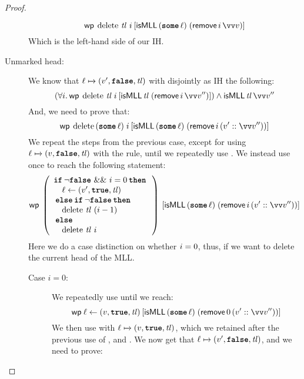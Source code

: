 \documentclass[thesis.tex]{subfiles}
\begin{document}
\begin{proof}
\begin{description}
\[                  \wpre{\MLLdelete\,\tl\ \iindex}{\isMLL\, (\Some \loc)\; (\textlog{remove}\, \iindex\, \vect{\val})}
              \]
              Which is the left-hand side of our IH.
        \item[Unmarked head:] We know that $\loc \fmapsto (\val', \False, \tl)$ with disjointly as IH the following:
              \[(\All \iindex. \wpre{\MLLdelete\, \tl\; \iindex}{\isMLL\, \tl\; (\textlog{remove}\, \iindex\, \vect{\val}'')}) \land \isMLL\, \tl\, \vect{\val}''\]
              And, we need to prove that:
              \[\wpre{\MLLdelete\, (\Some \loc)\; \iindex}{\isMLL\, (\Some \loc)\; (\textlog{remove}\, \iindex\, (\val' :: \vect{\val}''))}\]
              We repeat the steps from the previous case, except for using $\loc \fmapsto (\val, \False, \tl)$ with the  rule, until we repeatedly use . We instead use  once to reach the following statement:
              \[
                  \wpre{\left(
                      \begin{array}{l}
                              \If \lnot\False\ \&\&\ \iindex = 0 then \\
                              \quad \loc \gets (\val', \True, \tl)    \\
                              \Else \If \lnot\False then              \\
                              \quad \MLLdelete\,\tl\ (\iindex - 1)    \\
                              \Else                                   \\
                              \quad \MLLdelete\,\tl\ \iindex
                          \end{array}
                      \right)}{\isMLL\, (\Some \loc)\; (\textlog{remove}\, \iindex\, (\val' :: \vect{\val}''))}
              \]
              Here we do a case distinction on whether $i = 0$, thus, if we want to delete the current head of the MLL.
              \begin{description}
                  \item[Case $i = 0$:] We repeatedly use  until we reach:
                        \[
                            \wpre{\loc \gets (\val, \True, \tl)}{\isMLL\, (\Some \loc)\; (\textlog{remove}\, 0\, (\val' :: \vect{\val}''))}
                        \]
                        We then use  with $\loc \fmapsto (\val, \True, \tl)$, which we retained after the previous use of , and . We now get that $\loc \fmapsto (\val', \False, \tl)$, and we need to prove:

\end{description}
\end{description}
\end{proof}
\end{document}
